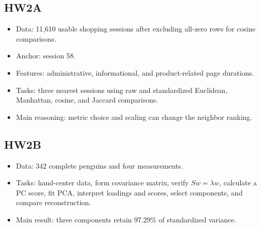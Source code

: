 \documentclass[11pt]{article}
\begin{document}
\subsection{HW2A}
\begin{itemize}
	\item Data: 11,610 usable shopping sessions after excluding all-zero rows for cosine comparisons.
	\item Anchor: session 58.
	\item Features: administrative, informational, and product-related page durations.
	\item Tasks: three nearest sessions using raw and standardized Euclidean, Manhattan, cosine, and Jaccard comparisons.
	\item Main reasoning: metric choice and scaling can change the neighbor ranking.
\end{itemize}

\subsection{HW2B}
\begin{itemize}
	\item Data: 342 complete penguins and four measurements.
	\item Tasks: hand-center data, form covariance matrix, verify $Sw=\lambda w$, calculate a PC score, fit PCA, interpret loadings and scores, select components, and compare reconstruction.
	\item Main result: three components retain 97.29\% of standardized variance.
\end{itemize}
\end{document}
